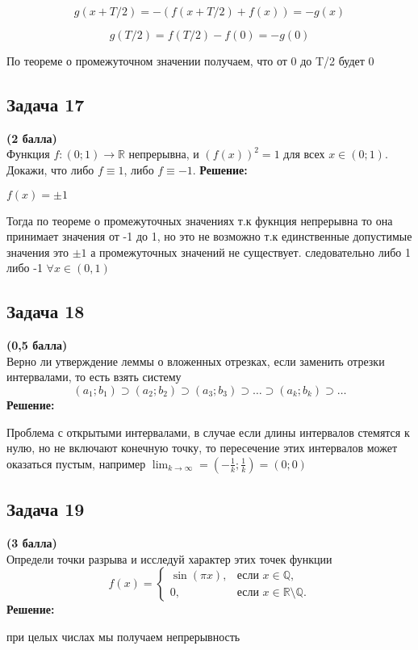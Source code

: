 \documentclass[a4paper,12pt]{article}
\begin{document}
\[
g(x+T/2) = -(f(x+T/2) + f(x))=-g(x) 
\]

\[
g(T/2) = f(T/2) - f(0) = -g(0)
\]

По теореме о промежуточном значении получаем, что от 0 до T/2 будет 0


\subsection{Задача 17}
\textbf{(2 балла)} \\
Функция $f : (0; 1) \to \mathbb{R}$ непрерывна, и $(f(x))^2 = 1$ для всех $x \in (0; 1)$. Докажи, что либо $f \equiv 1$, либо $f \equiv -1$.
\textbf{Решение:}

$f(x)=\pm 1$

Тогда по теореме о промежуточных значениях т.к фукнция непрерывна то она принимает значения от -1 до 1, но это не возможно т.к единственные допустимые значения это $\pm 1$ а промежуточных значений не существует. следовательно либо 1 либо -1 $\forall x \in (0, 1)$

\subsection{Задача 18}
\textbf{(0,5 балла)} \\
Верно ли утверждение леммы о вложенных отрезках, если заменить отрезки интервалами, то есть взять систему
\[
(a_1; b_1) \supset (a_2; b_2) \supset (a_3; b_3) \supset \dots \supset (a_k; b_k) \supset \dots
\]
\textbf{Решение:}

Проблема с открытыми интервалами, в случае если длины интервалов стемятся к нулю, но не включают конечную точку, то пересечение этих интервалов может оказаться пустым, например $\lim_{k \to \infty} = (-\frac{1}{k}; \frac{1}{k})=(0; 0)$

\subsection{Задача 19}
\textbf{(3 балла)} \\
Определи точки разрыва и исследуй характер этих точек функции
\[
f(x) =
\begin{cases}
    \sin(\pi x), & \text{если } x \in \mathbb{Q}, \\
    0, & \text{если } x \in \mathbb{R} \setminus \mathbb{Q}.
\end{cases}
\]
\textbf{Решение:}

при целых числах мы получаем непрерывность
\end{document}
